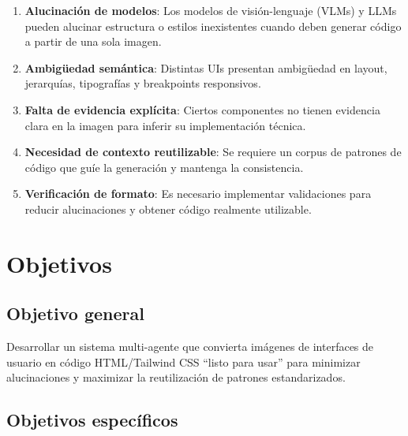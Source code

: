 \documentclass[12pt,a4paper]{article}
\begin{document}
\begin{enumerate}
    \item \textbf{Alucinación de modelos}: Los modelos de visión-lenguaje (VLMs) y LLMs pueden alucinar estructura o estilos inexistentes cuando deben generar código a partir de una sola imagen.
    
    \item \textbf{Ambigüedad semántica}: Distintas UIs presentan ambigüedad en layout, jerarquías, tipografías y breakpoints responsivos.
    
    \item \textbf{Falta de evidencia explícita}: Ciertos componentes no tienen evidencia clara en la imagen para inferir su implementación técnica.
    
    \item \textbf{Necesidad de contexto reutilizable}: Se requiere un corpus de patrones de código que guíe la generación y mantenga la consistencia.
    
    \item \textbf{Verificación de formato}: Es necesario implementar validaciones para reducir alucinaciones y obtener código realmente utilizable.
\end{enumerate}

\section{Objetivos}

\subsection{Objetivo general}

Desarrollar un sistema multi-agente que convierta imágenes de interfaces de usuario en código HTML/Tailwind CSS ``listo para usar'' para minimizar alucinaciones y maximizar la reutilización de patrones estandarizados.

\subsection{Objetivos específicos}
\end{document}
